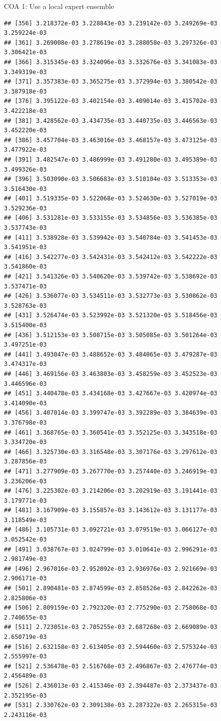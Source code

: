 \documentclass[ignorenonframetext,]{beamer}
\begin{document}
\begin{frame}[fragile]{COA 1: Use a local expert ensemble}
\begin{verbatim}
## [356] 3.218372e-03 3.228843e-03 3.239142e-03 3.249269e-03 3.259224e-03
## [361] 3.269008e-03 3.278619e-03 3.288058e-03 3.297326e-03 3.306421e-03
## [366] 3.315345e-03 3.324096e-03 3.332676e-03 3.341083e-03 3.349319e-03
## [371] 3.357383e-03 3.365275e-03 3.372994e-03 3.380542e-03 3.387918e-03
## [376] 3.395122e-03 3.402154e-03 3.409014e-03 3.415702e-03 3.422218e-03
## [381] 3.428562e-03 3.434735e-03 3.440735e-03 3.446563e-03 3.452220e-03
## [386] 3.457704e-03 3.463016e-03 3.468157e-03 3.473125e-03 3.477922e-03
## [391] 3.482547e-03 3.486999e-03 3.491280e-03 3.495389e-03 3.499326e-03
## [396] 3.503090e-03 3.506683e-03 3.510104e-03 3.513353e-03 3.516430e-03
## [401] 3.519335e-03 3.522068e-03 3.524630e-03 3.527019e-03 3.529236e-03
## [406] 3.531281e-03 3.533155e-03 3.534856e-03 3.536385e-03 3.537743e-03
## [411] 3.538928e-03 3.539942e-03 3.540784e-03 3.541453e-03 3.541951e-03
## [416] 3.542277e-03 3.542431e-03 3.542412e-03 3.542222e-03 3.541860e-03
## [421] 3.541326e-03 3.540620e-03 3.539742e-03 3.538692e-03 3.537471e-03
## [426] 3.536077e-03 3.534511e-03 3.532773e-03 3.530862e-03 3.528763e-03
## [431] 3.526474e-03 3.523992e-03 3.521320e-03 3.518456e-03 3.515400e-03
## [436] 3.512153e-03 3.508715e-03 3.505085e-03 3.501264e-03 3.497251e-03
## [441] 3.493047e-03 3.488652e-03 3.484065e-03 3.479287e-03 3.474317e-03
## [446] 3.469156e-03 3.463803e-03 3.458259e-03 3.452523e-03 3.446596e-03
## [451] 3.440478e-03 3.434168e-03 3.427667e-03 3.420974e-03 3.414090e-03
## [456] 3.407014e-03 3.399747e-03 3.392289e-03 3.384639e-03 3.376798e-03
## [461] 3.368765e-03 3.360541e-03 3.352125e-03 3.343518e-03 3.334720e-03
## [466] 3.325730e-03 3.316548e-03 3.307176e-03 3.297612e-03 3.287856e-03
## [471] 3.277909e-03 3.267770e-03 3.257440e-03 3.246919e-03 3.236206e-03
## [476] 3.225302e-03 3.214206e-03 3.202919e-03 3.191441e-03 3.179771e-03
## [481] 3.167909e-03 3.155857e-03 3.143612e-03 3.131177e-03 3.118549e-03
## [486] 3.105731e-03 3.092721e-03 3.079519e-03 3.066127e-03 3.052542e-03
## [491] 3.038767e-03 3.024799e-03 3.010641e-03 2.996291e-03 2.981749e-03
## [496] 2.967016e-03 2.952092e-03 2.936976e-03 2.921669e-03 2.906171e-03
## [501] 2.890481e-03 2.874599e-03 2.858526e-03 2.842262e-03 2.825806e-03
## [506] 2.809159e-03 2.792320e-03 2.775290e-03 2.758068e-03 2.740655e-03
## [511] 2.723051e-03 2.705255e-03 2.687268e-03 2.669089e-03 2.650719e-03
## [516] 2.632158e-03 2.613405e-03 2.594460e-03 2.575324e-03 2.555997e-03
## [521] 2.536478e-03 2.516768e-03 2.496867e-03 2.476774e-03 2.456489e-03
## [526] 2.436013e-03 2.415346e-03 2.394487e-03 2.373437e-03 2.352195e-03
## [531] 2.330762e-03 2.309138e-03 2.287322e-03 2.265315e-03 2.243116e-03

\end{verbatim}
\end{frame}
\end{document}
